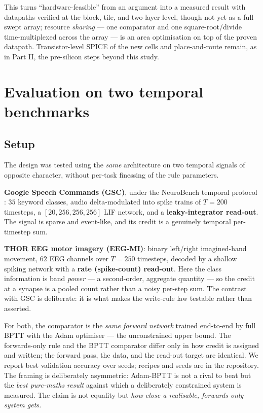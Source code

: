 \documentclass[11pt]{article}
\begin{document}
This turns ``hardware-feasible'' from an argument into a measured result
with datapaths verified at the block, tile, and two-layer level, though
not yet as a full swept array; resource \emph{sharing} --- one
comparator and one square-root/divide time-multiplexed across the array
--- is an area optimisation on top of the proven datapath.
Transistor-level SPICE of the new cells and place-and-route remain, as
in Part II, the pre-silicon steps beyond this study.

\hypertarget{sec:eval}{%
\section{Evaluation on two temporal benchmarks}\label{sec:eval}}

\hypertarget{setup}{%
\subsection{Setup}\label{setup}}

The design was tested using the \emph{same} architecture on two temporal
signals of opposite character, without per-task finessing of the rule
parameters.

\textbf{Google Speech Commands (GSC)}, under the NeuroBench temporal
protocol \cite{warden2018speech, yik2024neurobench}: \(35\) keyword
classes, audio delta-modulated into spike trains of \(T=200\) timesteps,
a \([20,256,256,256]\) LIF network, and a \textbf{leaky-integrator
read-out}. The signal is sparse and event-like, and its credit is a
genuinely temporal per-timestep sum.

\textbf{THOR EEG motor imagery (EEG-MI)}: binary left/right
imagined-hand movement, \(62\) EEG channels over \(T=250\) timesteps,
decoded by a shallow spiking network with a \textbf{rate (spike-count)
read-out}. Here the class information is band \emph{power} --- a
second-order, aggregate quantity --- so the credit at a synapse is a
pooled count rather than a noisy per-step sum. The contrast with GSC is
deliberate: it is what makes the write-rule law testable rather than
asserted.

For both, the comparator is the \emph{same forward network} trained
end-to-end by full BPTT with the Adam optimiser --- the unconstrained
upper bound. The forwards-only rule and the BPTT comparator differ only
in how credit is assigned and written; the forward pass, the data, and
the read-out target are identical. We report best validation accuracy
over seeds; recipes and seeds are in the repository. The framing is
deliberately asymmetric: Adam-BPTT is not a rival to beat but the
\emph{best pure-maths result} against which a deliberately constrained
system is measured. The claim is not equality but \emph{how close a
realisable, forwards-only system gets.}
\end{document}
